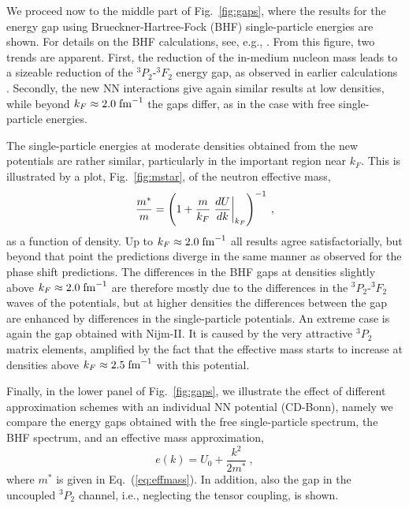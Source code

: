 \documentclass[rmp,preprint,aps,floatfix]{revtex4}
\begin{document}
We proceed now to the middle part of Fig.~\ref{fig:gaps}, where
the results for the energy gap using Brueckner-Hartree-Fock (BHF) 
single-particle energies are shown.  
For details on the BHF calculations, see, e.g., \cite{jjm76}.  
From this figure, two trends are apparent.
First, the reduction of the in-medium nucleon mass leads to a sizeable 
reduction of the $^3P_2$-$^3F_2$ energy gap, as observed in 
earlier calculations \cite{amu85,bcll92,taka93,elga96}.  
Secondly, the new NN interactions give again similar results 
at low densities, while beyond $k_F\approx 2.0\;{\rm fm}^{-1}$ 
the gaps differ, as in the case with free single-particle energies.   

The single-particle energies at moderate densities obtained from the 
new potentials are rather similar, particularly in the 
important region near $k_F$.  
This is illustrated by a plot, Fig.~\ref{fig:mstar},
of the neutron effective mass,
\begin{equation}
 {m^*\over m} = \left( 1 + {m\over k_F} 
 \left.{dU\over dk}\right|_{k_F} \right)^{-1} \:,
\label{eq:effmass}
\end{equation}
as a function of density.
Up to $k_F \approx 2.0\;{\rm fm}^{-1}$ all results agree satisfactorially,
but beyond that point the predictions diverge in the same manner as observed
for the phase shift predictions.
The differences in the BHF gaps at densities slightly above  
$k_F\approx 2.0\;{\rm fm}^{-1}$ are therefore mostly 
due to the differences in the $^3P_2$-$^3F_2$ waves of the potentials,
but at higher densities the differences between the gap are enhanced 
by differences in the single-particle potentials.
An extreme case is again the gap obtained with Nijm-II.  
It is caused by the very attractive $^3P_2$ matrix elements, 
amplified by the fact that the effective mass 
starts to increase at densities above $k_F\approx 2.5\;{\rm fm}^{-1}$ 
with this potential.  



Finally, in the lower panel of Fig.~\ref{fig:gaps}, we illustrate the
effect of different approximation schemes with an individual NN potential
(CD-Bonn), namely we compare the energy gaps obtained 
with the free single-particle spectrum, the BHF spectrum,
and an effective mass approximation,
\begin{equation}
  e(k) = U_0 + \frac{k^2}{2m^*} \:,
\label{eq:mstarapp}
\end{equation}
where $m^*$ is given in Eq.~(\ref{eq:effmass}).
In addition, also the gap in the uncoupled $^3P_2$ channel, 
i.e., neglecting the tensor coupling, is shown.
\end{document}
